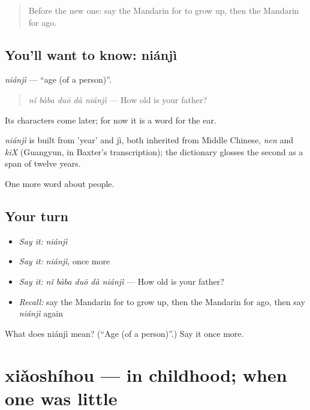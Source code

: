 \begin{quote}
Before the new one: say the Mandarin for to grow up, then the Mandarin for ago.
\end{quote}

\subsection*{You'll want to know: niánjì}
\emph{niánjì} — \textquotedblleft{}age (of a person)\textquotedblright{}.

\begin{quote}
\emph{nǐ bàba duō dà niánjì} — How old is your father?
\end{quote}

Its characters come later; for now it is a word for the ear.

\begin{cousinweb}
\emph{niánjì} is built from  'year' and jì, both inherited from Middle Chinese, \emph{nen} and \emph{kiX} (Guangyun, in Baxter's transcription); the dictionary glosses the second as a span of twelve years.
\end{cousinweb}

\begin{grammarlens}[title={What you've built}]
One more word about people.
\end{grammarlens}

\subsection*{Your turn}
\begin{itemize}
\raggedright
  \item \emph{Say it:} \emph{niánjì}
  \item \emph{Say it:} \emph{niánjì}, once more
  \item \emph{Say it:} \emph{nǐ bàba duō dà niánjì} — How old is your father?
  \item \emph{Recall:} say the Mandarin for to grow up, then the Mandarin for ago, then say \emph{niánjì} again
\end{itemize}

\begin{tcolorbox}[breakable,colback=teal!4,colframe=teal!35!black,title={Before you move on}]
What does niánjì mean? (\textquotedblleft{}Age (of a person)\textquotedblright{}.) Say it once more.
\end{tcolorbox}
\section[xiǎoshíhou]{xiǎoshíhou — in childhood; when one was little}

